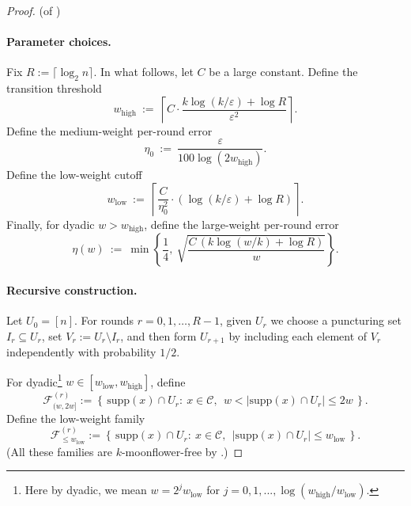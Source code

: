 \documentclass[10pt,a4paper]{amsart}
\DeclareMathOperator{\high}{\mathrm{high}}
\DeclareMathOperator{\low}{\mathrm{low}}
\newcommand{\calC}{\mathcal{C}}
\newcommand{\calF}{\mathcal{F}}
\newcommand{\ignore}[1]{{}}
\newcommand{\shachar}[1]{\textcolor{blue}{(Shachar: {#1})}}
\newcommand{\supp}{\mathrm{supp}}
\newcommand{\yimeng}[1]{\textcolor{orange}{(Yimeng: {#1})}}
\begin{document}
\begin{proof}(of )

\paragraph{Parameter choices.}
Fix $R:=\lceil \log_2 n\rceil$. In what follows, let $C$ be a large constant. Define the transition threshold \ignore{\shachar{we have 3 unspecified constants $C$ below, do we assume they are all the same? if not then lets call them $C_1,C_2,C_3$; this then needs to be propagated into the proof} \yimeng{I think we can assume they are the same. As long as it's large enough, the proof should go through.}\shachar{at least it should be clear if $C$ should be large enough or small enough. EG if we incrase $C$ does it keep everything consistent?}}
\[
w_{\mathrm{high}}\ :=\ \left\lceil
C\cdot \frac{k\log(k/\varepsilon)+\log R}{\varepsilon^2}
\right\rceil.
\]
Define the medium-weight per-round error
\[
\eta_0\ :=\ \frac{\varepsilon}{100\log(2w_{\mathrm{high}})}.
\]
Define the low-weight cutoff
\[
w_{\mathrm{low}}\ :=\ \left\lceil \frac{C}{\eta_0^2}\cdot\left(\log(k/\varepsilon)+\log R\right)\right\rceil.
\]
Finally, for dyadic $w>w_{\mathrm{high}}$, define the large-weight per-round error
\[
\eta(w)\ :=\ \min\left\{\frac14,\ \sqrt{\frac{C\,(k\log( w/k)+\log R)}{w}}\right\}.
\]

\paragraph{Recursive construction.}
Let $U_0=[n]$. For rounds $r=0,1,\dots,R-1$, given $U_r$ we choose a puncturing set $I_r\subseteq U_r$,
set $V_r:=U_r\setminus I_r$, and then form $U_{r+1}$ by including each element of $V_r$
independently with probability $1/2$.

For dyadic\footnote{Here by dyadic, we mean $w = 2^j w_{\low}$ for $j = 0,1,...,\log (w_{\high} / w_{\low})$.} $w\in[w_{\low},w_{\high}]$, define
\[
\calF^{(r)}_{(w,2w]}
:=
\left\{\,\supp(x)\cap U_r:\ x\in\calC,\ \ w<|\supp(x)\cap U_r|\le 2w\,\right\}.
\]
Define the low-weight family
\[
\calF^{(r)}_{\le w_{\low}}
:=
\left\{\,\supp(x)\cap U_r:\ x\in\calC,\ \ |\supp(x)\cap U_r|\le w_{\low}\,\right\}.
\]
(All these families are $k$-moonflower-free by .)


\end{proof}
\end{document}
